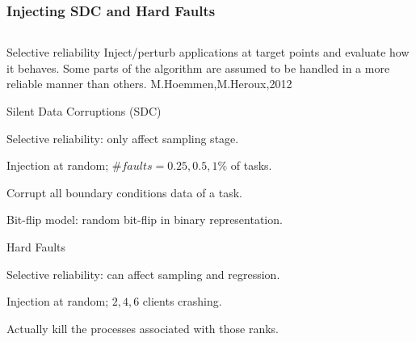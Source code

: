 \begin{frame}
\frametitle{Injecting SDC and Hard Faults}
%
\begin{columns}
\begin{column}{1.1\textwidth}

\begin{block}{Selective reliability}
Inject/perturb applications at target points and evaluate how it behaves. 
Some parts of the algorithm are assumed to be handled in a 
more reliable manner than others. \footnotesize{M.Hoemmen,M.Heroux,2012}
\end{block}

\pause
\begin{block}{Silent Data Corruptions (SDC)}
\bi
\item Selective reliability: only affect sampling stage.
\item Injection at random; $\# faults = 0.25, 0.5, 1 \%$ of tasks.
\item Corrupt all boundary conditions data of a task.
\item Bit-flip model: random bit-flip in binary representation. 
\ei
\end{block}
%
\pause
\begin{block}{Hard Faults}
\bi
\item Selective reliability: can affect sampling and regression.
\item Injection at random; $2, 4, 6$ clients crashing.
\item Actually kill the processes associated with those ranks.
\ei
\end{block}
\end{column}
\end{columns}
%
\end{frame}






